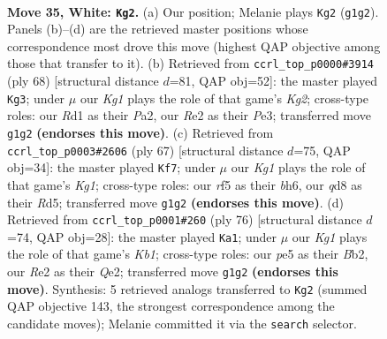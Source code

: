 \documentclass[11pt]{article}
\begin{document}
\clearpage

\begin{figure}[p]\centering
\begin{subfigure}{0.46\textwidth}\centering
\resizebox{\linewidth}{!}{%
\newchessgame
\chessboard[
  setfen={r1bq2k1/8/8/4pr1p/2p4P/p1P3P1/P1QBR3/3R2K1 w - - 12 35},
  showmover=false,
  pgfstyle=straightmove, color=movearrow, markmove={g1-g2}
]}
\caption{}
\end{subfigure}\hfill
\begin{subfigure}{0.46\textwidth}\centering
\resizebox{\linewidth}{!}{%
\newchessgame
\chessboard[
  setfen={2r4k/1q3r1p/3B2pP/p1p5/2Q1R2P/4P3/P4PK1/8 w - - 1 35},
  showmover=false,
  pgfstyle=straightmove, color=movearrow, markmove={g2-g3}
]}
\caption{}
\end{subfigure}
\\[4pt]
\begin{subfigure}{0.46\textwidth}\centering
\resizebox{\linewidth}{!}{%
\newchessgame
\chessboard[
  setfen={6k1/7p/p1pq3B/3r1bP1/1P1P1p2/8/P3QP2/3R2K1 b - - 0 34},
  showmover=false,
  pgfstyle=straightmove, color=movearrow, markmove={g8-f7}
]}
\caption{}
\end{subfigure}\hfill
\begin{subfigure}{0.46\textwidth}\centering
\resizebox{\linewidth}{!}{%
\newchessgame
\chessboard[
  setfen={3r4/6pk/3rq3/p3p3/1pP1P3/1P1P2P1/1B2Q3/1K1R4 w - - 1 39},
  showmover=false,
  pgfstyle=straightmove, color=movearrow, markmove={b1-a1}
]}
\caption{}
\end{subfigure}
\caption{\textbf{Move 35, White: \texttt{Kg2}.} (a) Our position; Melanie plays \texttt{Kg2} (\texttt{g1g2}). Panels (b)--(d) are the retrieved master positions whose correspondence most drove this move (highest QAP objective among those that transfer to it). (b) Retrieved from \texttt{ccrl\_top\_p0000\#3914} (ply 68) [structural distance $d$=81, QAP obj=52]: the master played \texttt{Kg3}; under $\mu$ our \emph{Kg1} plays the role of that game's \emph{Kg2}; cross-type roles: our \emph{R}d1 as their \emph{P}a2, our \emph{R}e2 as their \emph{P}e3; transferred move \texttt{g1g2} \textbf{(endorses this move)}. (c) Retrieved from \texttt{ccrl\_top\_p0003\#2606} (ply 67) [structural distance $d$=75, QAP obj=34]: the master played \texttt{Kf7}; under $\mu$ our \emph{Kg1} plays the role of that game's \emph{Kg1}; cross-type roles: our \emph{r}f5 as their \emph{b}h6, our \emph{q}d8 as their \emph{R}d5; transferred move \texttt{g1g2} \textbf{(endorses this move)}. (d) Retrieved from \texttt{ccrl\_top\_p0001\#260} (ply 76) [structural distance $d$=74, QAP obj=28]: the master played \texttt{Ka1}; under $\mu$ our \emph{Kg1} plays the role of that game's \emph{Kb1}; cross-type roles: our \emph{p}e5 as their \emph{B}b2, our \emph{R}e2 as their \emph{Q}e2; transferred move \texttt{g1g2} \textbf{(endorses this move)}. Synthesis: 5 retrieved analogs transferred to \texttt{Kg2} (summed QAP objective 143, the strongest correspondence among the candidate moves); Melanie committed it via the \texttt{search} selector.}
\label{fig:thought-m68}
\end{figure}
\end{document}
